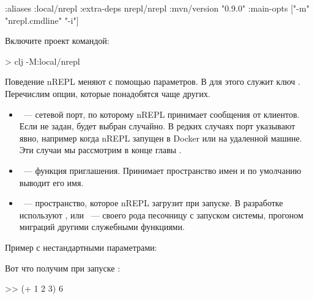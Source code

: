 \begin{english}
  \begin{clojure}
{:aliases
 {:local/nrepl
  {:extra-deps {nrepl/nrepl {:mvn/version "0.9.0"}}
   :main-opts ["-m" "nrepl.cmdline" "-i"]}}}
  \end{clojure}
\end{english}

Включите проект командой:

\begin{english}
  \begin{bash}
> clj -M:local/nrepl
  \end{bash}
\end{english}

Поведение nREPL меняют с помощью параметров. В  для этого служит ключ . Перечислим опции, которые понадобятся чаще других.

\begin{itemize}

\item
  ~--- сетевой порт, по которому nREPL принимает сообщения от клиентов. Если не задан, будет выбран случайно. В редких случаях порт указывают явно, например когда nREPL запущен в Docker или на удаленной машине. Эти случаи мы рассмотрим в конце главы .

\item
  ~--- функция приглашения. Принимает пространство имен и по умолчанию выводит его имя.

\item
  ~--- пространство, которое nREPL загрузит при запуске. В разработке используют ,  или ~--- своего рода песочницу с запуском системы, прогоном миграций другими служебными функциями.

\end{itemize}

Пример с нестандартными параметрами:

\begin{english}
\end{english}

Вот что получим при запуске :

\begin{english}
  \begin{bash}
[dev] >> (+ 1 2 3)
6
  \end{bash}
\end{english}


